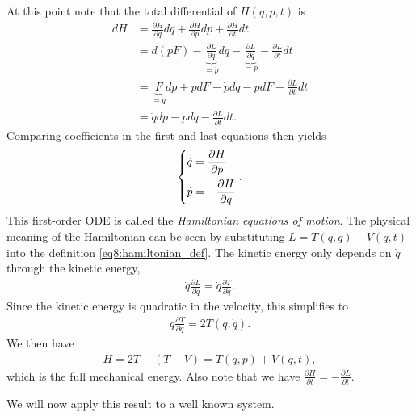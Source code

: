 \begin{ex}
At this point note that the total differential of $H(q,p,t)$ is
\begin{subequations}
\begin{align}
	dH &= \frac{\partial H}{\partial q}dq + \frac{\partial H}{\partial p}dp + \frac{\partial H}{\partial t}dt \\
	   &= d(pF) - \underbrace{\frac{\partial L}{\partial q}}_{=\dot{p}} dq - \underbrace{\frac{\partial L}{\partial \dot{q}}}_{=p} - \frac{\partial L}{\partial t}dt \\
	   &= \underbrace{F}_{=\dot{q}}dp + pdF - \dot{p}dq - pdF - \frac{\partial L}{\partial t}dt \\
	   &= \dot{q}dp - \dot{p}dq - \frac{\partial L}{\partial t}dt.
\end{align}
\end{subequations}
Comparing coefficients in the first and last equations then yields
\begin{align}
	\begin{dcases}
		\dot{q} = \frac{\partial H}{\partial p}\\
		\dot{p} = -\frac{\partial H}{\partial q}
	\end{dcases}
.	
\end{align}
This first-order ODE is called the \emph{Hamiltonian equations of motion}. The physical meaning of the Hamiltonian can be seen by substituting $L = T(q,\dot{q}) - V(q, t)$ into the definition \ref{eq8:hamiltonian_def}. The kinetic energy only depends on $\dot q$ through the kinetic energy, 
\begin{align}
\dot{q}\frac{\partial L}{\partial \dot{q}} = \dot{q} \frac{\partial T}{\partial \dot{q}}.
\end{align}
Since the kinetic energy is quadratic in the velocity, this simplifies to 
\begin{align}
\dot{q} \frac{\partial T}{\partial \dot{q}} = 2T(q,\dot{q}).
\end{align}
We then have 
\begin{align}
H = 2T - (T - V) = T(q, p) + V(q,t),
\end{align}
which is the full mechanical energy. Also note that we have $\frac{\partial H}{\partial t} = - \frac{\partial L}{\partial t}$.
\end{ex}

We will now apply this result to a well known system.

